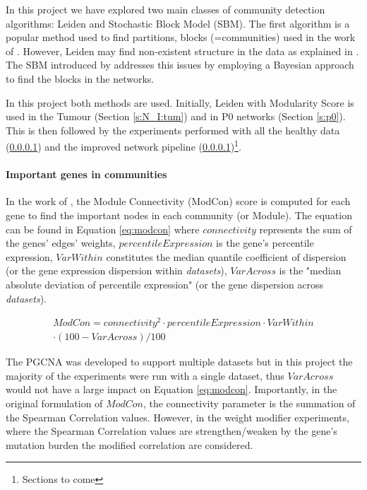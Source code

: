 In this project we have explored two main classes of community detection algorithms: Leiden and Stochastic Block Model (SBM). The first algorithm is a popular method used to find partitions, blocks (=communities) used in the work of \citet{Care2019-ij}. However, Leiden may find non-existent structure in the data as explained in \citet{Peixoto2021-jx}. The SBM introduced by \citet{Peixoto2019-fg} addresses this issues by employing a Bayesian approach to find the blocks in the networks. 

In this project both methods are used. Initially, Leiden with Modularity Score is used in the Tumour (Section \ref{s:N_I:tum}) and in P0 networks (Section \ref{s:p0}). This is then followed by the experiments performed with all the healthy data (\ref{}) and the improved network pipeline (\ref{})\footnote{Sections to come}.

\paragraph{Important genes in communities}

In the work of \citet{Care2019-ij}, the  Module Connectivity (ModCon) score is computed for each gene to find the important nodes in each community (or Module). The equation can be found in Equation \ref{eq:modcon} where $connectivity$ represents the sum of the genes' edges' weights, $percentileExpression$ is the gene's percentile expression, $VarWithin$ constitutes the median quantile coefficient of dispersion (or the gene expression dispersion within \textit{datasets}), $VarAcross$ is the "median absolute deviation of percentile expression" (or the gene dispersion across \textit{datasets}).

\begin{multline} \label{eq:modcon}
         ModCon = connectivity^2 \cdot percentileExpression \cdot VarWithin \\
         \cdot (100 - VarAcross) / 100
\end{multline}

The PGCNA was developed to support multiple datasets but in this project the majority of the experiments were run with a single dataset, thus $VarAcross$ would not have a large impact on Equation \ref{eq:modcon}. Importantly, in the original formulation of $ModCon$, the connectivity parameter is the summation of the Spearman Correlation values. However, in the weight modifier experiments, where the Spearman Correlation values are strengthen/weaken by the gene's mutation burden the modified correlation are considered.

